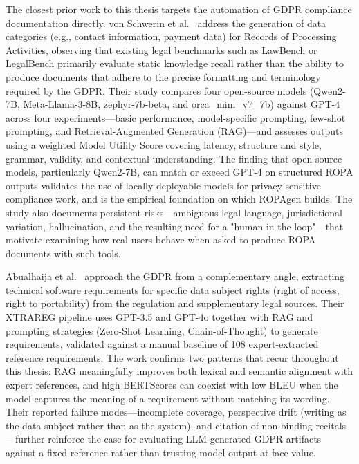 The closest prior work to this thesis targets the automation of GDPR compliance documentation directly. von Schwerin et al.\ \cite{schwerinSystematicComparisonOpen2024} address the generation of data categories (e.g., contact information, payment data) for Records of Processing Activities, observing that existing legal benchmarks such as LawBench or LegalBench primarily evaluate static knowledge recall rather than the ability to produce documents that adhere to the precise formatting and terminology required by the GDPR. Their study compares four open-source models (Qwen2-7B, Meta-Llama-3-8B, zephyr-7b-beta, and orca\_mini\_v7\_7b) against GPT-4 across four experiments---basic performance, model-specific prompting, few-shot prompting, and Retrieval-Augmented Generation (RAG)---and assesses outputs using a weighted Model Utility Score covering latency, structure and style, grammar, validity, and contextual understanding. The finding that open-source models, particularly Qwen2-7B, can match or exceed GPT-4 on structured ROPA outputs validates the use of locally deployable models for privacy-sensitive compliance work, and is the empirical foundation on which ROPAgen builds. The study also documents persistent risks---ambiguous legal language, jurisdictional variation, hallucination, and the resulting need for a "human-in-the-loop"---that motivate examining how real users behave when asked to produce ROPA documents with such tools.

Abualhaija et al.\ \cite{abualhaijaLLMassistedExtractionRegulatory2025} approach the GDPR from a complementary angle, extracting technical software requirements for specific data subject rights (right of access, right to portability) from the regulation and supplementary legal sources. Their XTRAREG pipeline uses GPT-3.5 and GPT-4o together with RAG and prompting strategies (Zero-Shot Learning, Chain-of-Thought) to generate requirements, validated against a manual baseline of 108 expert-extracted reference requirements. The work confirms two patterns that recur throughout this thesis: RAG meaningfully improves both lexical and semantic alignment with expert references, and high BERTScores can coexist with low BLEU when the model captures the meaning of a requirement without matching its wording. Their reported failure modes---incomplete coverage, perspective drift (writing as the data subject rather than as the system), and citation of non-binding recitals---further reinforce the case for evaluating LLM-generated GDPR artifacts against a fixed reference rather than trusting model output at face value.

